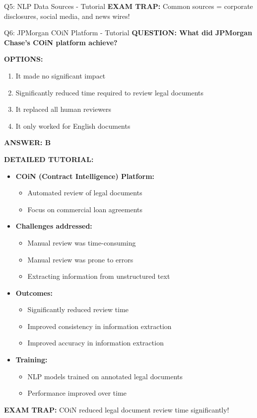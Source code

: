 \documentclass[8pt]{beamer}
\begin{document}
\begin{frame}{Q5: NLP Data Sources - Tutorial}
		\textcolor{myred}{\textbf{EXAM TRAP:}} Common sources = \textcolor{myblue}{corporate disclosures, social media, and news wires}!
	\end{frame}
	
	\begin{frame}{Q6: JPMorgan COiN Platform - Tutorial}
		\fontsize{6.5}{7.5}\selectfont
		\textbf{QUESTION: What did JPMorgan Chase's COiN platform achieve?}
		
		\vspace{0.1cm}
		\textbf{OPTIONS:}
		\begin{enumerate}
			\item It made no significant impact
			\item Significantly reduced time required to review legal documents
			\item It replaced all human reviewers
			\item It only worked for English documents
		\end{enumerate}
		
		\vspace{0.1cm}
		\textcolor{myblue}{\textbf{ANSWER: B}}
		
		\vspace{0.1cm}
		\textbf{DETAILED TUTORIAL:}
		\begin{itemize}
			\item \textbf{COiN (Contract Intelligence) Platform:}
			\begin{itemize}
				\item Automated review of legal documents
				\item Focus on commercial loan agreements
			\end{itemize}
			\item \textbf{Challenges addressed:}
			\begin{itemize}
				\item Manual review was time-consuming
				\item Manual review was prone to errors
				\item Extracting information from unstructured text
			\end{itemize}
			\item \textbf{Outcomes:}
			\begin{itemize}
				\item Significantly reduced review time
				\item Improved consistency in information extraction
				\item Improved accuracy in information extraction
			\end{itemize}
			\item \textbf{Training:}
			\begin{itemize}
				\item NLP models trained on annotated legal documents
				\item Performance improved over time
			\end{itemize}
		\end{itemize}
		
		\textcolor{myred}{\textbf{EXAM TRAP:}} COiN reduced \textcolor{myblue}{legal document review time} significantly!
	\end{frame}
	
\end{document}
